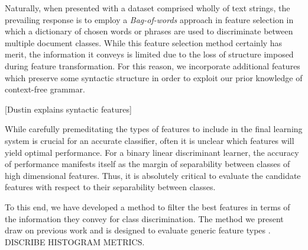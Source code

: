 
Naturally, when presented with a dataset comprised wholly of text strings, the prevailing response is to employ a \emph{Bag-of-words} approach in feature selection in which a dictionary of chosen words or phrases are used to discriminate between multiple document classes. While this feature selection method certainly has merit, the information it conveys is limited due to the loss of structure imposed during feature transformation. For this reason, we incorporate additional features which preserve some syntactic structure in order to exploit our prior knowledge of context-free grammar.

[Dustin explains syntactic features]

While carefully premeditating the types of features to include in the final learning system is crucial for an accurate classifier, often it is unclear which features will yield optimal performance. For a binary linear discriminant learner, the accuracy of performance manifests itself as the margin of separability between classes of high dimensional features. Thus, it is absolutely critical to evaluate the candidate features with respect to their separability between classes.

To this end, we have developed a method to filter the best features in terms of the information they convey for class discrimination. The method we present draw on previous work and is designed to evaluate generic feature types \cite{french}.
DISCRIBE HISTOGRAM METRICS.